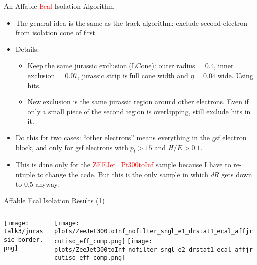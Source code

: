 \documentclass{beamer}
\begin{document}
\begin{frame}{An Affable \textcolor{red}{Ecal} Isolation Algorithm}
  \begin{itemize}
    \item The general idea is the same as the track algorithm: exclude second electron from isolation cone of first
    \item {\small{Details:}} 
      \begin{itemize}
        \item Keep the same jurassic exclusion (LCone): outer radius = 0.4, inner exclusion = 0.07, jurassic strip is full cone width and $\eta = 0.04$ wide. Using hits.
        \item New exclusion is the same jurassic region around other electrons. Even if only a small piece of the second region is overlapping, still exclude hits in it.
      \end{itemize}
    \item Do this for two cases: ``other electrons'' means everything in the gsf electron block, and only for gsf electrons with $p_t > 15$ and $H/E > 0.1$.
    \item This is done only for the \textcolor{red}{ZEEJet\_Pt300toInf} sample because I have to re-ntuple to change the code. But this is the only sample in which $dR$ gets down to 0.5 anyway.%
  \end{itemize}
\end{frame}


\begin{frame}{Affable Ecal Isolation Results (1)}
  \begin{columns}%
    \begin{column}{0.4\textwidth}
      \texttt{[image: talk3/jurassic\_border.png]}
    \end{column}
    \begin{column}{0.6\textwidth}
      \texttt{[image: plots/ZeeJet300toInf\_nofilter\_sngl\_e1\_drstat1\_ecal\_affjrcutiso\_eff\_comp.png]}
      \vspace{-0.2cm}
      \texttt{[image: plots/ZeeJet300toInf\_nofilter\_sngl\_e2\_drstat1\_ecal\_affjrcutiso\_eff\_comp.png]}
    \end{column}
  \end{columns}
\end{frame}
\end{document}

